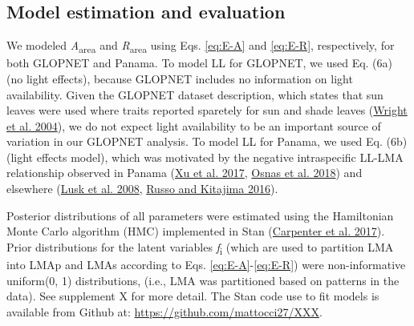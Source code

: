 \documentclass[
  12pt,
  a4paper,
,tablecaptionabove
]{scrartcl}
\begin{document}
\hypertarget{model-estimation-and-evaluation}{%
\subsection{Model estimation and evaluation}\label{model-estimation-and-evaluation}}

We modeled \emph{A}\textsubscript{area} and \emph{R}\textsubscript{area} using Eqs. \eqref{eq:E-A} and \eqref{eq:E-R}, respectively, for both GLOPNET and Panama.
To model LL for GLOPNET, we used Eq. (6a) (no light effects), because GLOPNET includes no information on light availability.
Given the GLOPNET dataset description, which states that sun leaves were used where traits reported sparetely for sun and shade leaves (\protect\hyperlink{ref-Wright2004a}{Wright et al. 2004}), we do not expect light availability to be an important source of variation in our GLOPNET analysis.
To model LL for Panama, we used Eq. (6b) (light effects model), which was motivated by the negative intraspecific LL-LMA relationship observed in Panama (\protect\hyperlink{ref-Xu2017}{Xu et al. 2017}, \protect\hyperlink{ref-Osnas2018}{Osnas et al. 2018}) and elsewhere (\protect\hyperlink{ref-Lusk2008}{Lusk et al. 2008}, \protect\hyperlink{ref-Russo2016}{Russo and Kitajima 2016}).

Posterior distributions of all parameters were estimated using the Hamiltonian Monte Carlo algorithm (HMC) implemented in Stan (\protect\hyperlink{ref-Carpenter2017}{Carpenter et al. 2017}).
Prior distributions for the latent variables \emph{f}\textsubscript{i} (which are used to partition LMA into LMAp and LMAs according to Eqs. \eqref{eq:E-A}-\eqref{eq:E-R}) were non-informative uniform(0, 1) distributions, (i.e., LMA was partitioned based on patterns in the data).
See supplement X for more detail.
The Stan code use to fit models is available from Github at: \href{https://github.com/mattocci27/LMApLMAs}{https://github.com/mattocci27/XXX}.
\end{document}
